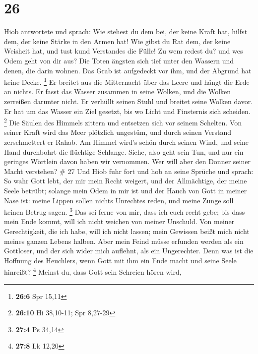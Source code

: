 \hypertarget{section-6}{%
\section{26}\label{section-6}}

 Hiob antwortete und sprach:  Wie stehest du dem
bei, der keine Kraft hat, hilfst dem, der keine Stärke in den Armen hat!
 Wie gibst du Rat dem, der keine Weisheit hat, und tust kund
Verstandes die Fülle!  Zu wem redest du? und wes Odem geht
von dir aus?  Die Toten ängsten sich tief unter den Wassern
und denen, die darin wohnen.  Das Grab ist aufgedeckt vor
ihm, und der Abgrund hat keine Decke. \footnote{\textbf{26:6} Spr 15,11}
 Er breitet aus die Mitternacht über das Leere und hängt die
Erde an nichts.  Er fasst das Wasser zusammen in seine
Wolken, und die Wolken zerreißen darunter nicht.  Er
verhüllt seinen Stuhl und breitet seine Wolken davor.  Er
hat um das Wasser ein Ziel gesetzt, bis wo Licht und Finsternis sich
scheiden. \footnote{\textbf{26:10} Hi 38,10-11; Spr 8,27-29}
 Die Säulen des Himmels zittern und entsetzen sich vor
seinem Schelten.  Von seiner Kraft wird das Meer plötzlich
ungestüm, und durch seinen Verstand zerschmettert er Rahab.
 Am Himmel wird's schön durch seinen Wind, und seine Hand
durchbohrt die flüchtige Schlange.  Siehe, also geht sein
Tun, und nur ein geringes Wörtlein davon haben wir vernommen. Wer will
aber den Donner seiner Macht verstehen? \# 27  Und Hiob fuhr
fort und hob an seine Sprüche und sprach:  So wahr Gott
lebt, der mir mein Recht weigert, und der Allmächtige, der meine Seele
betrübt;  solange mein Odem in mir ist und der Hauch von
Gott in meiner Nase ist:  meine Lippen sollen nichts
Unrechtes reden, und meine Zunge soll keinen Betrug sagen. \footnote{\textbf{27:4}
  Ps 34,14}  Das sei ferne von mir, dass ich euch recht
gebe; bis dass mein Ende kommt, will ich nicht weichen von meiner
Unschuld.  Von meiner Gerechtigkeit, die ich habe, will ich
nicht lassen; mein Gewissen beißt mich nicht meines ganzen Lebens
halben.  Aber mein Feind müsse erfunden werden als ein
Gottloser, und der sich wider mich auflehnt, als ein Ungerechter.
 Denn was ist die Hoffnung des Heuchlers, wenn Gott mit ihm
ein Ende macht und seine Seele hinreißt? \footnote{\textbf{27:8} Lk
  12,20}  Meinst du, dass Gott sein Schreien hören wird,

